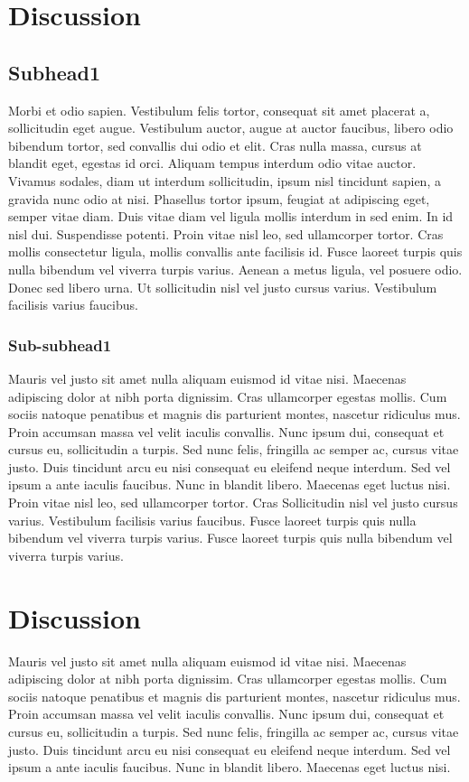 \section*{Discussion}
\subsection*{Subhead1}
Morbi et odio sapien. Vestibulum felis tortor, consequat sit amet placerat a, sollicitudin eget augue. Vestibulum auctor, augue at auctor faucibus, libero odio bibendum tortor, sed convallis dui odio et elit. Cras nulla massa, cursus at blandit eget, egestas id orci. Aliquam tempus interdum odio vitae auctor. Vivamus sodales, diam ut interdum sollicitudin, ipsum nisl tincidunt sapien, a gravida nunc odio at nisi. Phasellus tortor ipsum, feugiat at adipiscing eget, semper vitae diam. Duis vitae diam vel ligula mollis interdum in sed enim. In id nisl dui. Suspendisse potenti.
Proin vitae nisl leo, sed ullamcorper tortor. Cras mollis consectetur ligula, mollis convallis ante facilisis id. Fusce laoreet turpis quis nulla bibendum vel viverra turpis varius. Aenean a metus ligula, vel posuere odio. Donec sed libero urna. Ut sollicitudin nisl vel justo cursus varius. Vestibulum facilisis varius faucibus.
\subsubsection*{Sub-subhead1}
Mauris vel justo sit amet nulla aliquam euismod id vitae nisi. Maecenas adipiscing dolor at nibh porta dignissim. Cras ullamcorper egestas mollis. Cum sociis natoque penatibus et magnis dis parturient montes, nascetur ridiculus mus. Proin accumsan massa vel velit iaculis convallis. Nunc ipsum dui, consequat et cursus eu, sollicitudin a turpis. Sed nunc felis, fringilla ac semper ac, cursus vitae justo. Duis tincidunt arcu eu nisi consequat eu eleifend neque interdum. Sed vel ipsum a ante iaculis faucibus. Nunc in blandit libero. Maecenas eget luctus nisi. Proin vitae nisl leo, sed ullamcorper tortor. Cras 
Sollicitudin nisl vel justo cursus varius. Vestibulum facilisis varius faucibus. Fusce laoreet turpis quis nulla bibendum vel viverra turpis varius. Fusce laoreet turpis quis nulla bibendum vel viverra turpis varius.

\section*{Discussion} %
Mauris vel justo sit amet nulla aliquam euismod id vitae nisi. Maecenas adipiscing dolor at nibh porta dignissim. Cras ullamcorper egestas mollis. Cum sociis natoque penatibus et magnis dis parturient montes, nascetur ridiculus mus. Proin accumsan massa vel velit iaculis convallis. Nunc ipsum dui, consequat et cursus eu, sollicitudin a turpis. Sed nunc felis, fringilla ac semper ac, cursus vitae justo. Duis tincidunt arcu eu nisi consequat eu eleifend neque interdum. Sed vel ipsum a ante iaculis faucibus. Nunc in blandit libero. Maecenas eget luctus nisi.


